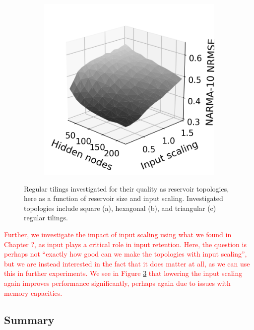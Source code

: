\begin{figure}[t]
\begin{subfigure}{.32\textwidth}
    \caption{}
    \label{fig:rt-is-hex}
  \end{subfigure}
  \begin{subfigure}{.32\textwidth}
    \centering
    \includegraphics[width=1.0\linewidth]{figures/regular-tilings-performance-is-tri.png}
    \caption{}
    \label{fi:rt-is-tri}
  \end{subfigure}
  \caption{
    Regular tilings investigated for their quality as reservoir topologies, here
as a function of reservoir size and input scaling. Investigated topologies
include square (a), hexagonal (b), and triangular (c) regular tilings.
  }
  \label{fig:rt-performance-is}
\end{figure}

\textcolor{red}{
  Further, we investigate the impact of input scaling using what we found in
Chapter ?, as input plays a critical role in input retention. Here, the question
is perhaps not ``exactly how good can we make the topologies with input
scaling'', but we are instead interested in the fact that it does matter at all,
as we can use this in further experiments. We see in Figure
\ref{fig:rt-performance-is} that lowering the input scaling again improves
performance significantly, perhaps again due to issues with memory capacities.
}

\subsection{Summary}

